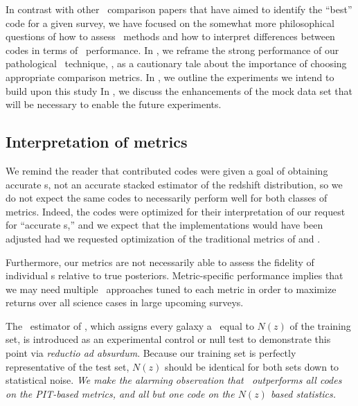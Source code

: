 
In contrast with other \pzpdf\ comparison papers that have aimed to identify the ``best'' code for a given survey, we have focused on the somewhat more philosophical questions of how to assess \pzpdf\ methods and how to interpret differences between codes in terms of \pzpdf\ performance.
In , we reframe the strong performance of our pathological \pzpdf\ technique, \trainz, as a cautionary tale about the importance of choosing appropriate comparison metrics.
In , we outline the experiments we intend to build upon this study
In , we discuss the enhancements of the mock data set that will be necessary to enable the future experiments.

\subsection{Interpretation of metrics}
\label{sec:caution}

We remind the reader that contributed codes were given a goal of obtaining accurate \pzpdf s, not an accurate stacked estimator of the redshift distribution, so we do not expect the same codes to necessarily perform well for both classes of metrics.
Indeed, the codes were optimized for their interpretation of our request for ``accurate \pzpdf s,'' and we expect that the implementations would have been adjusted had we requested optimization of the traditional metrics of  and .

Furthermore, our metrics are not necessarily able to assess the fidelity of individual \pzpdf s relative to true posteriors.
Metric-specific performance implies that we may need multiple \pzpdf\ approaches tuned to each metric in order to maximize returns over all science cases in large upcoming surveys.

The \trainz\ estimator of , which assigns every galaxy a \pzpdf\ equal to $N(z)$ of the training set, is introduced as an experimental control or null test to demonstrate this point via \textit{reductio ad absurdum}.
Because our training set is perfectly representative of the test set, $N(z)$ should be identical for both sets down to statistical noise.
\textit{We make the alarming observation that \trainz\ outperforms all codes on the PIT-based metrics, and all but one code on the $N(z)$ based statistics.}

